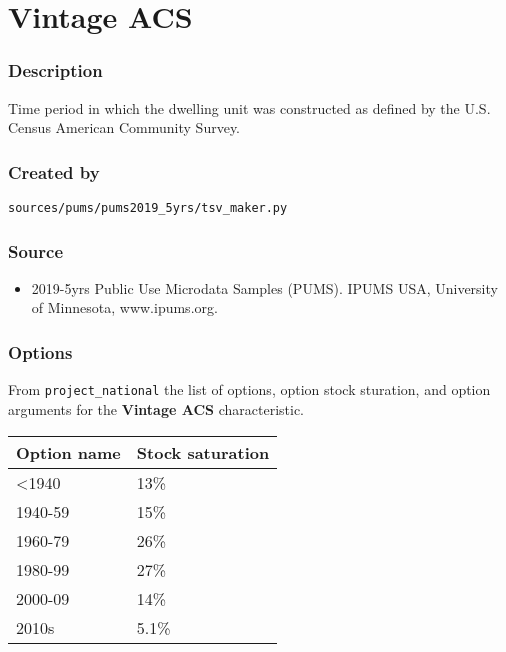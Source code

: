 \section{Vintage ACS}\label{vintage_acs}

\subsubsection{Description}\label{description-144}

Time period in which the dwelling unit was constructed as defined by the
U.S. Census American Community Survey.

\subsubsection{Created by}\label{created-by-145}

\texttt{sources/pums/pums2019\_5yrs/tsv\_maker.py}

\subsubsection{Source}\label{source-147}

\begin{itemize}
 
\item
  2019-5yrs Public Use Microdata Samples (PUMS). IPUMS USA, University
  of Minnesota, www.ipums.org.
\end{itemize}

\subsubsection{Options}\label{options-148}

From \texttt{project\_national} the list of options, option stock
sturation, and option arguments for the \textbf{Vintage ACS}
characteristic.

\begin{longtable}[]{@{}ll@{}}
\toprule\noalign{}
Option name & Stock saturation \\
\midrule\noalign{}
\endhead
\bottomrule\noalign{}
\endlastfoot
\textless1940 & 13\% \\
1940-59 & 15\% \\
1960-79 & 26\% \\
1980-99 & 27\% \\
2000-09 & 14\% \\
2010s & 5.1\% \\
\end{longtable}

